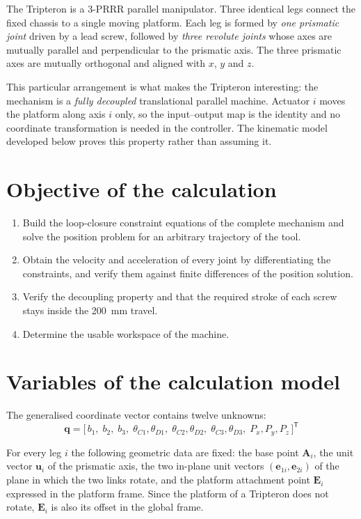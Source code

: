 \documentclass[11pt]{article}
\begin{document}
The Tripteron is a 3-PRRR parallel manipulator. Three identical legs connect the fixed
chassis to a single moving platform. Each leg is formed by
\emph{one prismatic joint} driven by a lead screw, followed by \emph{three revolute
joints} whose axes are mutually parallel and perpendicular to the prismatic axis. The
three prismatic axes are mutually orthogonal and aligned with $x$, $y$ and $z$.

This particular arrangement is what makes the Tripteron interesting: the mechanism is a
\emph{fully decoupled} translational parallel machine. Actuator $i$ moves the platform
along axis $i$ only, so the input--output map is the identity and no coordinate
transformation is needed in the controller. The kinematic model developed below proves
this property rather than assuming it.

\section{Objective of the calculation}\label{sec:kin-obj}

\begin{enumerate}[leftmargin=*,nosep]
  \item Build the loop-closure constraint equations of the complete mechanism and solve
        the position problem for an arbitrary trajectory of the tool.
  \item Obtain the velocity and acceleration of every joint by differentiating the
        constraints, and verify them against finite differences of the position solution.
  \item Verify the decoupling property and that the required stroke of each screw stays
        inside the \SI{200}{\milli\metre} travel.
  \item Determine the usable workspace of the machine.
\end{enumerate}

\section{Variables of the calculation model}\label{sec:kin-var}

The generalised coordinate vector contains twelve unknowns:
\begin{equation}
\bm q=\bigl[\,b_1,\;b_2,\;b_3,\;\theta_{C1},\theta_{D1},\;\theta_{C2},\theta_{D2},\;
\theta_{C3},\theta_{D3},\;P_x,P_y,P_z\,\bigr]^{\mathsf T}
\end{equation}

For every leg $i$ the following geometric data are fixed: the base point $\bm A_i$, the
unit vector $\bm u_i$ of the prismatic axis, the two in-plane unit vectors
$(\bm e_{1i},\bm e_{2i})$ of the plane in which the two links rotate, and the platform
attachment point $\bm E_i$ expressed in the platform frame. Since the platform of a
Tripteron does not rotate, $\bm E_i$ is also its offset in the global frame.
\end{document}
